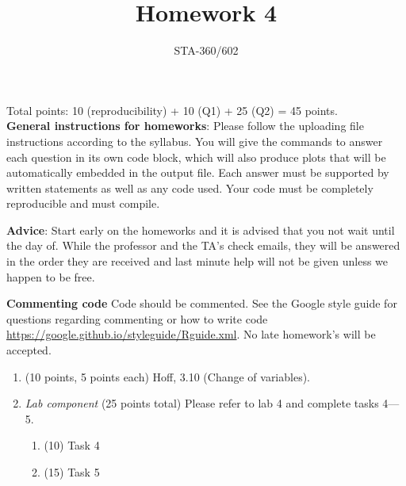 \documentclass{article}
\begin{document}
\title{Homework 4}
\author{STA-360/602}
\date{}
\maketitle

Total points: 10 (reproducibility) + 10 (Q1) + 25 (Q2) = 45 points. \\

\textbf{General instructions for homeworks}: Please follow the uploading file instructions according to the syllabus. You will give the commands to answer each question in its own code block, which will also produce plots that will be automatically embedded in the output file. Each answer must be supported by written statements as well as any code used. Your code must be completely reproducible and must compile. 

\textbf{Advice}: Start early on the homeworks and it is advised that you not wait until the day of. While the professor and the TA's check emails, they will be answered in the order they are received and last minute help will not be given unless we happen to be free.  

\textbf{Commenting code}
Code should be commented. See the Google style guide for questions regarding commenting or how to write 
code \url{https://google.github.io/styleguide/Rguide.xml}. No late homework's will be accepted.


\begin{enumerate}
\item (10 points, 5 points each) Hoff, 3.10 (Change of variables). 


\item {\em Lab component} 
  (25 points total) Please refer to lab 4 and complete tasks 4---5. 
  \begin{enumerate}
  \item (10) Task 4
  \item (15) Task 5
  \end{enumerate}
  
\end{enumerate}
\end{document}
